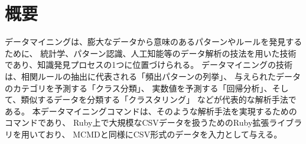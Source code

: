 

\section{概要}
データマイニングは、膨大なデータから意味のあるパターンやルールを発見するために、
統計学、パターン認識、人工知能等のデータ解析の技法を用いた技術であり、知識発見プロセスの1つに位置づけられる。
データマイニングの技術は、相関ルールの抽出に代表される「頻出パターンの列挙」、
与えられたデータのカテゴリを予測する「クラス分類」、
実数値を予測する「回帰分析」、そして、類似するデータを分類する「クラスタリング」
などが代表的な解析手法である。
本データマイニングコマンドは、そのような解析手法を実現するためのコマンドであり、
Ruby上で大規模なCSVデータを扱うためのRuby拡張ライブラリを用いており、
MCMDと同様にCSV形式のデータを入力として与える。

